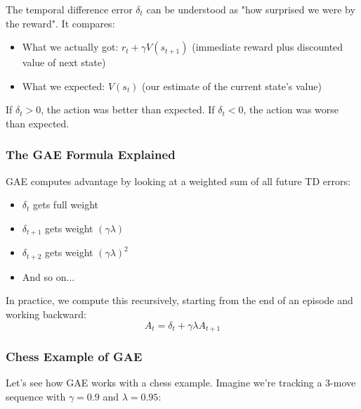 \documentclass[11pt]{article}
\begin{document}
The temporal difference error $\delta_t$ can be understood as "how surprised we were by the reward". It compares:
\begin{itemize}
    \item What we actually got: $r_t + \gamma V(s_{t+1})$ (immediate reward plus discounted value of next state)
    \item What we expected: $V(s_t)$ (our estimate of the current state's value)
\end{itemize}

If $\delta_t > 0$, the action was better than expected. If $\delta_t < 0$, the action was worse than expected.

\subsubsection*{The GAE Formula Explained}

GAE computes advantage by looking at a weighted sum of all future TD errors:
\begin{itemize}
    \item $\delta_t$ gets full weight
    \item $\delta_{t+1}$ gets weight $(\gamma \lambda)$
    \item $\delta_{t+2}$ gets weight $(\gamma \lambda)^2$
    \item And so on...
\end{itemize}

In practice, we compute this recursively, starting from the end of an episode and working backward:
\begin{equation}
    A_t = \delta_t + \gamma \lambda A_{t+1}
\end{equation}

\subsubsection*{Chess Example of GAE}

Let's see how GAE works with a chess example. Imagine we're tracking a 3-move sequence with $\gamma = 0.9$ and $\lambda = 0.95$:
\end{document}
